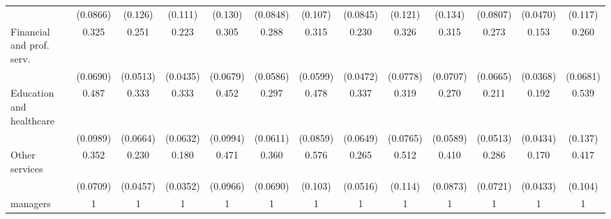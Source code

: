 {\begin{tabular}{l*{12}{c}}
                    &    (0.0866)         &     (0.126)         &     (0.111)         &     (0.130)         &    (0.0848)         &     (0.107)         &    (0.0845)         &     (0.121)         &     (0.134)         &    (0.0807)         &    (0.0470)         &     (0.117)         \\
[1em]
Financial and prof. serv.&       0.325\sym{***}&       0.251\sym{***}&       0.223\sym{***}&       0.305\sym{***}&       0.288\sym{***}&       0.315\sym{***}&       0.230\sym{***}&       0.326\sym{***}&       0.315\sym{***}&       0.273\sym{***}&       0.153\sym{***}&       0.260\sym{***}\\
                    &    (0.0690)         &    (0.0513)         &    (0.0435)         &    (0.0679)         &    (0.0586)         &    (0.0599)         &    (0.0472)         &    (0.0778)         &    (0.0707)         &    (0.0665)         &    (0.0368)         &    (0.0681)         \\
[1em]
Education and healthcare&       0.487\sym{***}&       0.333\sym{***}&       0.333\sym{***}&       0.452\sym{***}&       0.297\sym{***}&       0.478\sym{***}&       0.337\sym{***}&       0.319\sym{***}&       0.270\sym{***}&       0.211\sym{***}&       0.192\sym{***}&       0.539\sym{*}  \\
                    &    (0.0989)         &    (0.0664)         &    (0.0632)         &    (0.0994)         &    (0.0611)         &    (0.0859)         &    (0.0649)         &    (0.0765)         &    (0.0589)         &    (0.0513)         &    (0.0434)         &     (0.137)         \\
[1em]
Other services      &       0.352\sym{***}&       0.230\sym{***}&       0.180\sym{***}&       0.471\sym{***}&       0.360\sym{***}&       0.576\sym{**} &       0.265\sym{***}&       0.512\sym{**} &       0.410\sym{***}&       0.286\sym{***}&       0.170\sym{***}&       0.417\sym{***}\\
                    &    (0.0709)         &    (0.0457)         &    (0.0352)         &    (0.0966)         &    (0.0690)         &     (0.103)         &    (0.0516)         &     (0.114)         &    (0.0873)         &    (0.0721)         &    (0.0433)         &     (0.104)         \\
[1em]
managers            &           1         &           1         &           1         &           1         &           1         &           1         &           1         &           1         &           1         &           1         &           1         &           1         \\

\end{tabular}}
